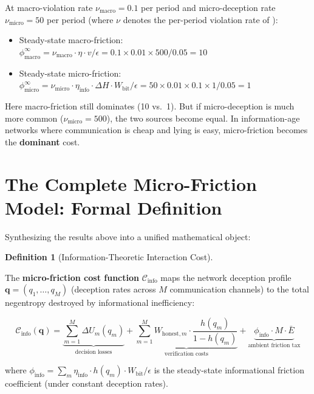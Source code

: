 \documentclass[11pt]{article}
\theoremstyle{plain}
\theoremstyle{definition}
\newtheorem{definition}{Definition}
\theoremstyle{remark}
\let\origsection\section
\renewcommand{\section}{\needspace{12\baselineskip}\origsection}
\providecommand{\tightlist}{%
  \setlength{\itemsep}{0pt}\setlength{\parskip}{0pt}}
\begin{document}
At macro-violation rate \(\nu_{\text{macro}} = 0.1\) per period and
micro-deception rate \(\nu_{\text{micro}} = 50\) per period (where
\(\nu\) denotes the per-period violation rate of \citep{TC-IV}):

\begin{itemize}
\tightlist
\item
  Steady-state macro-friction:
  \(\phi_{\text{macro}}^{\infty} = \nu_{\text{macro}} \cdot \eta \cdot v / \epsilon = 0.1 \times 0.01 \times 500 / 0.05 = 10\)
\item
  Steady-state micro-friction:
  \(\phi_{\text{micro}}^{\infty} = \nu_{\text{micro}} \cdot \eta_{\text{info}} \cdot \Delta H \cdot W_{\text{bit}} / \epsilon = 50 \times 0.01 \times 0.1 \times 1 / 0.05 = 1\)
\end{itemize}

Here macro-friction still dominates (10 vs.~1). But if micro-deception
is much more common (\(\nu_{\text{micro}} = 500\)), the two sources
become equal. In information-age networks where communication is cheap
and lying is easy, micro-friction becomes the \textbf{dominant} cost.

\section{The Complete Micro-Friction Model: Formal
Definition}\label{the-complete-micro-friction-model-formal-definition}

Synthesizing the results above into a unified mathematical object:

\begin{definition}[Information-Theoretic Interaction Cost]
\label{def-info-interaction-cost}

The \textbf{micro-friction cost function} $\mathcal{C}_{\text{info}}$ maps the network deception profile $\mathbf{q} = (q_1, \ldots, q_M)$ (deception rates across $M$ communication channels) to the total negentropy destroyed by informational inefficiency:

$$\mathcal{C}_{\text{info}}(\mathbf{q}) = \underbrace{\sum_{m=1}^{M} \Delta U_m(q_m)}_{\text{decision losses}} + \underbrace{\sum_{m=1}^{M} W_{\text{honest},m} \cdot \frac{h(q_m)}{1 - h(q_m)}}_{\text{verification costs}} + \underbrace{\phi_{\text{info}} \cdot M \cdot \bar{E}}_{\text{ambient friction tax}}$$

where $\phi_{\text{info}} = \sum_{m} \eta_{\text{info}} \cdot h(q_m) \cdot W_{\text{bit}} / \epsilon$ is the steady-state informational friction coefficient (under constant deception rates).
\end{definition}
\end{document}
